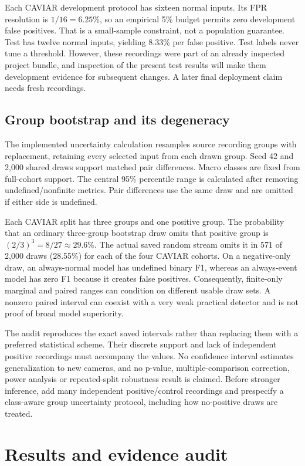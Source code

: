 \documentclass[11pt,a4paper]{article}
\begin{document}
Each CAVIAR development protocol has sixteen normal inputs. Its FPR resolution is $1/16=6.25\%$, so an empirical 5\% budget permits zero development false positives. That is a small-sample constraint, not a population guarantee. Test has twelve normal inputs, yielding 8.33\% per false positive. Test labels never tune a threshold. However, these recordings were part of an already inspected project bundle, and inspection of the present test results will make them development evidence for subsequent changes. A later final deployment claim needs fresh recordings.

\subsection{Group bootstrap and its degeneracy}
The implemented uncertainty calculation resamples source recording groups with replacement, retaining every selected input from each drawn group. Seed 42 and 2,000 shared draws support matched pair differences. Macro classes are fixed from full-cohort support. The central 95\% percentile range is calculated after removing undefined/nonfinite metrics. Pair differences use the same draw and are omitted if either side is undefined.

Each CAVIAR split has three groups and one positive group. The probability that an ordinary three-group bootstrap draw omits that positive group is $(2/3)^3=8/27\approx29.6\%$. The actual saved random stream omits it in 571 of 2,000 draws (28.55\%) for each of the four CAVIAR cohorts. On a negative-only draw, an always-normal model has undefined binary F1, whereas an always-event model has zero F1 because it creates false positives. Consequently, finite-only marginal and paired ranges can condition on different usable draw sets. A nonzero paired interval can coexist with a very weak practical detector and is not proof of broad model superiority.

The audit reproduces the exact saved intervals rather than replacing them with a preferred statistical scheme. Their discrete support and lack of independent positive recordings must accompany the values. No confidence interval estimates generalization to new cameras, and no p-value, multiple-comparison correction, power analysis or repeated-split robustness result is claimed. Before stronger inference, add many independent positive/control recordings and prespecify a class-aware group uncertainty protocol, including how no-positive draws are treated.

\section{Results and evidence audit}
\end{document}
